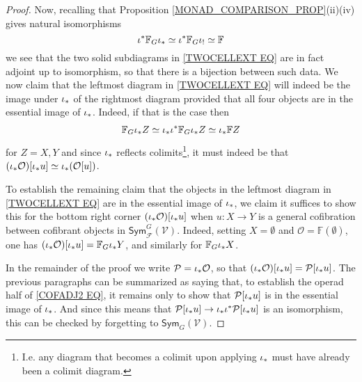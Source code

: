 \documentclass[a4paper,10pt
,draft
]{article}%
\numberwithin{equation}{section}
\numberwithin{figure}{section}
\theoremstyle{definition} %
\newcommand{\Sym}{\ensuremath{\mathsf{Sym}}}%
\newcommand{\V}{\ensuremath{\mathcal V}}
\renewcommand{\O}{\ensuremath{\mathcal O}}
\newcommand{\1}{\ensuremath{\mathbbm 1}}%
\begin{document}
\begin{proof}
%
Now, recalling that Proposition \ref{MONAD_COMPARISON_PROP}(ii)(iv) gives natural isomorphisms 
\[
\iota^{\**} \mathbb{F}_{G} \iota_{\**} \simeq
\iota^{\**} \mathbb{F}_{G} \iota_{!} \simeq
\mathbb{F}
\]
we see that the two solid subdiagrams in 
\eqref{TWOCELLEXT EQ}
are in fact adjoint up to isomorphism, so that there is a bijection between such data. 
We now claim that the leftmost diagram in
\eqref{TWOCELLEXT EQ}
will indeed be the image under $\iota_{\**}$
of the rightmost diagram
provided that all four objects 
are in the essential image of $\iota_{\**}$.
Indeed, 
if that is the case then
\begin{align*}
	\mathbb{F}_G \iota_{\**} Z \simeq 
	\iota_{\**} \iota^{\**} \mathbb{F}_G \iota_{\**} Z \simeq
	\iota_{\**} \mathbb{F} Z
\end{align*}
for $Z=X,Y$
and since $\iota_{\**}$ reflects colimits\footnote{I.e. any diagram that becomes a colimit upon applying $\iota_{\**}$ must have already been a colimit diagram.},
it must indeed be that
$(\iota_{\**} \mathcal{O})[\iota_{\**} u]
\simeq \iota_{\**} (\mathcal{O}[u])$.

To establish the remaining claim that the objects 
in the leftmost diagram in
\eqref{TWOCELLEXT EQ}
are in the essential image of $\iota_{\**}$,
we claim
it suffices to show this for the bottom right corner 
$(\iota_{\**} \mathcal{O})[\iota_{\**} u]$ when $u \colon X \to Y$ is a general cofibration between cofibrant objects in 
$\mathsf{Sym}^{G}_{\mathcal{F}}(\mathcal{V})$.
Indeed, setting  $X=\emptyset$ and $\O=\mathbb{F} (\emptyset)$, 
one has 
$(\iota_{\**} \mathcal{O})[\iota_{\**} u] = 
\mathbb{F}_{G} \iota_{\**} Y$, and similarly for $\mathbb{F}_{G} \iota_{\**} X$.

In the remainder of the proof we write
$\mathcal{P} = \iota_{\**} \mathcal{O}$, so that 
$(\iota_{\**} \mathcal{O})[\iota_{\**} u] = \mathcal{P}[\iota_{\**} u]$.
The previous paragraphs can be summarized as saying that,
to establish the operad half of 
\eqref{COFADJ2 EQ},
it remains only to show that 
$\mathcal{P}[\iota_{\**} u] $
is in the essential image of $\iota_{\**}$.
And since this means that
$\mathcal{P}[\iota_{\**} u] \to \iota_{\**} \iota^{\**} \mathcal{P}[\iota_{\**} u]$
is an isomorphism,
this can be checked by forgetting to $\Sym_G(\V)$.



\end{proof}
\end{document}
